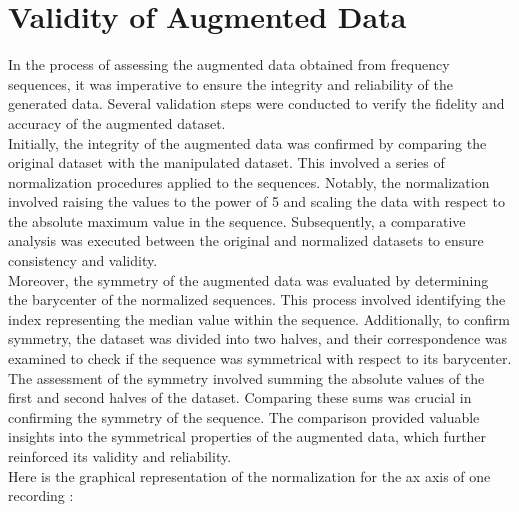 \section{Validity of Augmented Data}

In the process of assessing the augmented data obtained from frequency sequences, it was imperative to ensure the integrity and reliability of the generated data. Several validation steps were conducted to verify the fidelity and accuracy of the augmented dataset.\\

\noindent Initially, the integrity of the augmented data was confirmed by comparing the original dataset with the manipulated dataset. This involved a series of normalization procedures applied to the sequences. Notably, the normalization involved raising the values to the power of 5 and scaling the data with respect to the absolute maximum value in the sequence. Subsequently, a comparative analysis was executed between the original and normalized datasets to ensure consistency and validity.\\

\noindent Moreover, the symmetry of the augmented data was evaluated by determining the barycenter of the normalized sequences. This process involved identifying the index representing the median value within the sequence. Additionally, to confirm symmetry, the dataset was divided into two halves, and their correspondence was examined to check if the sequence was symmetrical with respect to its barycenter.
The assessment of the symmetry involved summing the absolute values of the first and second halves of the dataset. Comparing these sums was crucial in confirming the symmetry of the sequence. The comparison provided valuable insights into the symmetrical properties of the augmented data, which further reinforced its validity and reliability.\\

\vspace*{0.4cm}
\noindent Here is the graphical representation of the normalization for the ax axis of one recording :
\vspace*{0.3cm}

